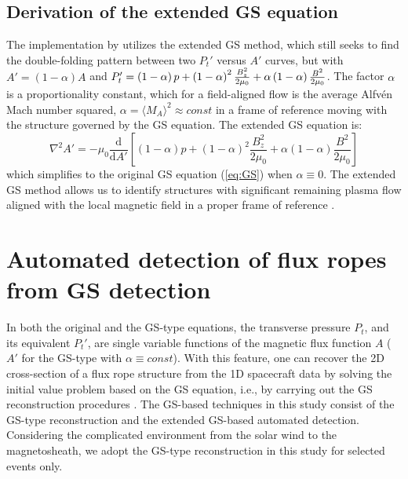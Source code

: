 \subsection{Derivation of the extended GS equation}
The implementation by \cite{Chen:2021} utilizes the extended GS method, which still seeks to find the double-folding pattern between two $P_t'$ versus $A'$ curves, but with $A'=(1-\alpha)A$ and $P_t'=\left( 1-\alpha \right)p + \left( 1-\alpha \right)^2\frac{B_z^2}{2\mu_0} + \alpha\left( 1-\alpha \right)\frac{B^2}{2\mu_0}$.  The factor $\alpha$ is a proportionality constant, which for a field-aligned flow is the average Alfv\'en Mach number squared, $\alpha=\langle M_A\rangle^2 \approx const$ in a frame of reference moving with the structure governed by the GS equation. The extended GS equation \citep{Teh:2018} is:
\begin{equation}
    \nabla^2 A' = -\mu_0\frac{\mathrm{d}}{\mathrm{d}A'}\left[\left(1-\alpha\right)p + \left(1-\alpha\right)^2\frac{B_z^2}{2\mu_0} + \alpha\left(1-\alpha\right)\frac{B^2}{2\mu_0} \right]
    \label{eq:GSextended}
\end{equation}
which simplifies to the original GS equation (\ref{eq:GS}) when $\alpha\equiv 0$. The extended GS method allows us to identify structures with significant remaining plasma ﬂow aligned with the local magnetic field in a proper frame of reference \citep{Chen:2022}.

\section{Automated detection of flux ropes from GS detection}
In both the original and the GS-type equations, the transverse pressure $P_t$, and its equivalent $P_t'$, are single variable functions of the magnetic flux function $A$ ($A'$ for the GS-type with $\alpha\equiv const$). With this feature, one can recover the 2D cross-section of a flux rope structure from the 1D spacecraft data by solving the initial value problem based on the GS equation, i.e., by carrying out the GS reconstruction procedures \citep{Hau:1999, HuSonnerup:2002, Hu:2017}. The GS-based techniques in this study consist of the GS-type reconstruction and the extended GS-based automated detection. Considering the complicated environment from the solar wind to the magnetosheath, we adopt the GS-type reconstruction in this study for selected events only.

